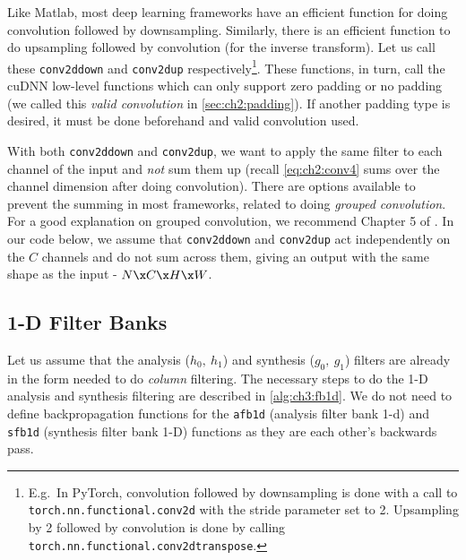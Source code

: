{%
\renewcommand{\_}{\textscale{.8}{\textunderscore}}
Like Matlab, most deep learning frameworks have an
efficient function for doing convolution followed by downsampling. Similarly,
there is an efficient function to do upsampling followed by convolution (for the
inverse transform). Let us call these \texttt{conv2d\_down} and
\texttt{conv2d\_up} respectively\footnote{E.g.\ In PyTorch, convolution followed
by downsampling is done with a call to \texttt{torch.nn.functional.conv2d} with
the stride parameter set to 2.  Upsampling by 2 followed by convolution is done
by calling \texttt{torch.nn.functional.conv2d\_transpose}.}.
These functions, in turn, call the cuDNN low-level functions which can only support
zero padding or no padding (we called this \emph{valid convolution} in
\autoref{sec:ch2:padding}). If another padding type is desired, it must be done beforehand and 
valid convolution used.

With both \texttt{conv2d\_down} and \texttt{conv2d\_up}, we want to apply the
same filter to each channel of the input and \emph{not} sum them up (recall
\eqref{eq:ch2:conv4} sums over the channel dimension after doing convolution).
There are options available to prevent the summing in most frameworks, related
to doing \emph{grouped convolution}. For a good explanation on grouped
convolution, we recommend Chapter 5 of \cite{Ioannou2017thesis}. In our code
below, we assume that \texttt{conv2d\_down} and \texttt{conv2d\_up} act
independently on the $C$ channels and do not sum across them, giving an
output with the same shape as the input - $N\x C\x H\x W$.
}

\subsection{1-D Filter Banks}
Let us assume that the analysis ($h_0,\ h_1$) and synthesis ($g_0,\ g_1$)
filters are already in the form needed to do \emph{column} filtering. The necessary
steps to do the 1-D analysis and synthesis filtering are described in
\autoref{alg:ch3:fb1d}. We do not need to define backpropagation functions for the
\texttt{afb1d} (analysis filter bank 1-d) and \texttt{sfb1d} (synthesis filter
bank 1-D) functions as they are each other's backwards pass.

